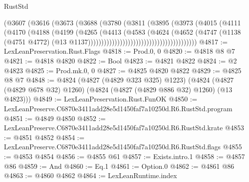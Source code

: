 \begin{lexlean}{RustStd}
\begin{coremodule}
                                            (@3607
                                              (@3616
                                                (@3673
                                                  (@3688
                                                    (@3780
                                                      (@3811
                                                        (@3895
                                                          (@3973
                                                            (@4015
                                                              (@4111
                                                                (@4170
                                                                  (@4188
                                                                    (@4199
                                                                      (@4265
                                                                        (@4413
                                                                          (@4583
                                                                            (@4624
                                                                              (@4652
                                                                                (@4747
                                                                                  (@1138
                                                                                    (@4751 @4772)
                                                                                    (@13
                                                                                      @1137)))))))))))))))))))))))))))))))))))))))))
@4817 := LexLeanPreservation.Rust.Flags
@4818 := Prod.{0, 0}
@4820 := @4818 @8 @7
@4821 := @4818 @4820
@4822 := Bool
@4823 := @4821 @4822
@4824 := @2 @4823
@4825 := Prod.mk.{0, 0}
@4827 := @4825 @4820 @4822
@4829 := @4825 @8 @7
@4848 := @4824
    (@4827 (@4829 @323 @325) @1223)
    (@4824 (@4827 (@4829 @678 @32) @1260) (@4824 (@4827 (@4829 @886 @32) @1260) (@13 @4823)))
@4849 := LexLeanPreservation.Rust.FunOK
@4850 := LexLeanPreserve.C6870e3411add28e5d1450faf7a10250d.R6.RustStd.program
@4851 := @4849 @4850
@4852 := LexLeanPreserve.C6870e3411add28e5d1450faf7a10250d.R6.RustStd.krate
@4853 := @4851 @4852
@4854 := LexLeanPreserve.C6870e3411add28e5d1450faf7a10250d.R6.RustStd.flags
@4855 := @4853 @4854
@4856 := @4855 @61
@4857 := Exists.intro.{1}
@4858 := @4857 @86
@4859 := And
@4860 := Eq.{1}
@4861 := Option.{0}
@4862 := @4861 @86
@4863 := @4860 @4862
@4864 := LexLeanRuntime.index

\end{coremodule}
\end{lexlean}
